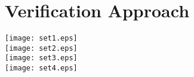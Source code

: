 \section{Verification Approach}

\texttt{[image: set1.eps]}\\
\texttt{[image: set2.eps]}\\
\texttt{[image: set3.eps]}\\
\texttt{[image: set4.eps]}